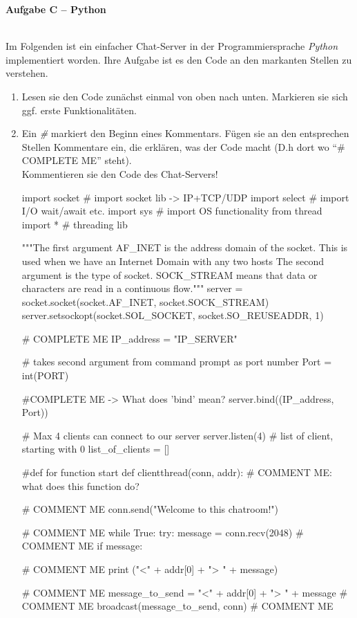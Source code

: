 \documentclass[paper=a4,fontsize=11pt]{scrartcl}%
\numberwithin{equation}{section}
\begin{document}
\begin{center}\Large{\textbf{Aufgabe C -- Python}}\end{center}
~\\
Im Folgenden ist ein einfacher Chat-Server in der Programmiersprache \emph{Python} implementiert worden. Ihre Aufgabe ist es den Code an den markanten Stellen zu verstehen.
\begin{enumerate}
	\item Lesen sie den Code zunächst einmal von oben nach unten. Markieren sie sich ggf. erste Funktionalitäten.
	\item Ein \emph{\#} markiert den Beginn eines Kommentars. Fügen sie an den entsprechen Stellen Kommentare ein, die erklären, was der Code macht (D.h dort wo \enquote{\# COMPLETE ME} steht).\\
	Kommentieren sie den Code des Chat-Servers!
\begin{python}
import socket # import socket lib -> IP+TCP/UDP
import select # import I/O wait/await etc.
import sys # import OS functionality
from thread import * # threading lib
 
"""The first argument AF_INET is the address domain of the
socket. This is used when we have an Internet Domain with
any two hosts The second argument is the type of socket.
SOCK_STREAM means that data or characters are read in
a continuous flow."""
server = socket.socket(socket.AF_INET, socket.SOCK_STREAM)
server.setsockopt(socket.SOL_SOCKET, socket.SO_REUSEADDR, 1)
 
 
# COMPLETE ME
IP_address = "IP_SERVER"
 
# takes second argument from command prompt as port number
Port = int(PORT)

#COMPLETE ME -> What does 'bind' mean?
server.bind((IP_address, Port))
 
# Max 4 clients can connect to our server
server.listen(4)
# list of client, starting with 0 
list_of_clients = []
 
#def for function start 
def clientthread(conn, addr): # COMMENT ME: what does this function do?
 
    # COMMENT ME
    conn.send("Welcome to this chatroom!")
 
 	# COMMENT ME
    while True:
            try:
                message = conn.recv(2048) # COMMENT ME
                if message:
 
                    # COMMENT ME
                    print ("<" + addr[0] + "> " + message)
 
                    # COMMENT ME
                    message_to_send = "<" + addr[0] + "> " + message # COMMENT ME 
                    broadcast(message_to_send, conn) # COMMENT ME
 

\end{python}
\end{enumerate}
\end{document}

